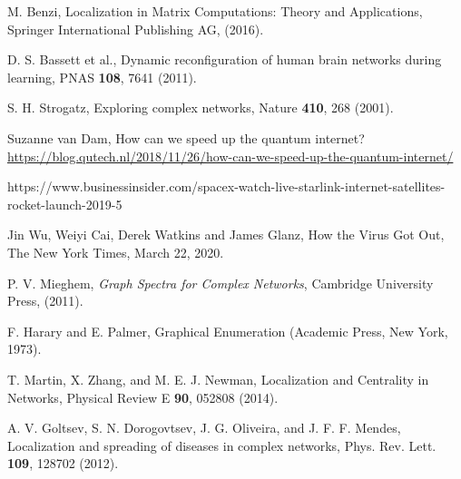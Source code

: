 \documentclass[envcountreset,oribibl]{llncs}
\begin{document}
\begin{thebibliography}{0}
 M. Benzi, Localization in Matrix Computations: Theory and Applications, Springer International Publishing AG, (2016).

 D. S. Bassett et al., Dynamic reconfiguration of human brain networks during learning, PNAS \textbf{108}, 7641 (2011). 

 S. H. Strogatz, Exploring complex networks, Nature \textbf{410}, 268 (2001).






 Suzanne van Dam, How can we speed up the quantum internet? \url{https://blog.qutech.nl/2018/11/26/how-can-we-speed-up-the-quantum-internet/}

 https://www.businessinsider.com/spacex-watch-live-starlink-internet-satellites-rocket-launch-2019-5

 Jin Wu, Weiyi Cai, Derek Watkins and James Glanz, How the Virus Got Out, The New York Times, March 22, 2020.


 P. V. Mieghem, \emph{Graph Spectra for Complex Networks}, Cambridge University Press, (2011).

 F. Harary and E. Palmer, Graphical Enumeration (Academic Press, New York, 1973).

 T. Martin, X. Zhang, and M. E. J. Newman, Localization and Centrality in Networks, Physical Review E {\bf 90}, 052808 (2014).

 A. V. Goltsev, S. N. Dorogovtsev, J. G. Oliveira, and J. F. F. Mendes, Localization and spreading of diseases in complex networks, Phys. Rev. Lett. \textbf{109}, 128702 (2012).


\end{thebibliography}
\end{document}
